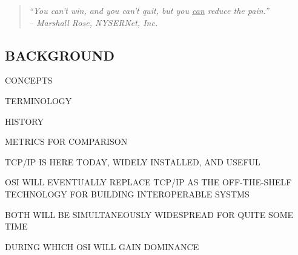 \begin{bwslide}

\begin{quote}\em
``You can't win, and you can't quit, but you \underline{can} reduce the
pain.''\\ \raggedleft
-- Marshall Rose, NYSERNet, Inc.
\end{quote}
\end{bwslide}


\begin{bwslide}
\part	{BACKGROUND}\bf

\begin{nrtc}
\item	CONCEPTS

\item	TERMINOLOGY

\item	HISTORY

\item	METRICS FOR COMPARISON
\end{nrtc}
\end{bwslide}


\begin{bwslide}

\begin{nrtc}
\item	TCP/IP IS HERE TODAY, WIDELY INSTALLED, AND USEFUL

\item	OSI WILL EVENTUALLY REPLACE TCP/IP AS THE OFF-THE-SHELF TECHNOLOGY FOR
	BUILDING INTEROPERABLE SYSTMS

\item	BOTH WILL BE SIMULTANEOUSLY WIDESPREAD FOR QUITE SOME TIME
    \begin{nrtc}
    \item	DURING WHICH OSI WILL GAIN DOMINANCE
    \end{nrtc}
\end{nrtc}
\end{bwslide}


